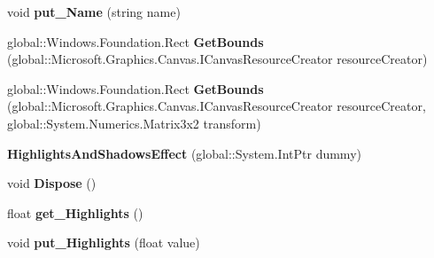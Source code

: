 \begin{DoxyCompactItemize}
void {\bfseries put\+\_\+\+Name} (string name)
\item 
\mbox{\label{class_microsoft_1_1_graphics_1_1_canvas_1_1_effects_1_1_highlights_and_shadows_effect_a66405063039c09cfa97133d2a4735b0b}} 
global\+::\+Windows.\+Foundation.\+Rect {\bfseries Get\+Bounds} (global\+::\+Microsoft.\+Graphics.\+Canvas.\+I\+Canvas\+Resource\+Creator resource\+Creator)
\item 
\mbox{\label{class_microsoft_1_1_graphics_1_1_canvas_1_1_effects_1_1_highlights_and_shadows_effect_a52c38c5ad7bad6373c8a4bfa4c833cdf}} 
global\+::\+Windows.\+Foundation.\+Rect {\bfseries Get\+Bounds} (global\+::\+Microsoft.\+Graphics.\+Canvas.\+I\+Canvas\+Resource\+Creator resource\+Creator, global\+::\+System.\+Numerics.\+Matrix3x2 transform)
\item 
\mbox{\label{class_microsoft_1_1_graphics_1_1_canvas_1_1_effects_1_1_highlights_and_shadows_effect_a49c24ba8cbbe709553a047ed0a174cd5}} 
{\bfseries Highlights\+And\+Shadows\+Effect} (global\+::\+System.\+Int\+Ptr dummy)
\item 
\mbox{\label{class_microsoft_1_1_graphics_1_1_canvas_1_1_effects_1_1_highlights_and_shadows_effect_a46bf03f4381128bc91a8897ab8420b8e}} 
void {\bfseries Dispose} ()
\item 
\mbox{\label{class_microsoft_1_1_graphics_1_1_canvas_1_1_effects_1_1_highlights_and_shadows_effect_ad3f72cfd6e6d3034e5bfe3baa01927c1}} 
float {\bfseries get\+\_\+\+Highlights} ()
\item 
\mbox{\label{class_microsoft_1_1_graphics_1_1_canvas_1_1_effects_1_1_highlights_and_shadows_effect_a3be5bf341f60d60d01dde1546fb07565}} 
void {\bfseries put\+\_\+\+Highlights} (float value)
\item 
\mbox{\label{class_microsoft_1_1_graphics_1_1_canvas_1_1_effects_1_1_highlights_and_shadows_effect_a9f62693f3bc1030624ce81336333d4e3}} 

\end{DoxyCompactItemize}
